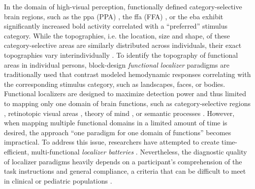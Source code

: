 In the domain of high-visual perception, functionally defined
category-selective brain regions, such as the \acl{ppa} (PPA)
\citep{epstein1998ppa}, the \acl{ffa} (FFA) \citep{kanwisher1997ffa}, or the
\ac{eba} \citep{downing2001bodyarea} exhibit significantly increased \acf{bold}
activity correlated with a ``preferred'' \citep[][p.
123]{debeck2008interpreting} stimulus category.
%
While the topographies, i.e. the location, size and shape, of these
category-selective areas are similarly distributed across individuals, their
exact topographies vary interindividually \citep{rosenke2021probabilistic,
zhen2017quantifying, zhen2015quantifying, frost2012measuring}.
To identify the topography of functional areas in individual persons,
block-design \textit{functional localizer} paradigms are traditionally used that
contrast modeled hemodynamic responses correlating with the corresponding
stimulus category, such as landscapes, faces, or bodies.
Functional localizers are designed to maximize detection power and thus limited
to mapping only one domain of brain functions, such as category-selective
regions \citep{stigliani2015temporal}, retinotopic visual areas
\citep{wang2015probabilistic}, theory of mind \citep{spunt2014validating}, or
semantic processes \citep{fedorenko2010new, fernandez2001language}.
However, when mapping multiple functional domains in a limited amount of time is
desired, the approach ``one paradigm for one domain of functions'' becomes
impractical.
To address this issue, researchers have attempted to create time-efficient,
multi-functional \textit{localizer batteries} \citep[e.g.,][]{barch2013function,
drobyshevsky2006rapid, pinel2007fast}.
Nevertheless, the diagnostic quality of localizer paradigms heavily depends on a
participant's comprehension of the task instructions and general compliance, a
criteria that can be difficult to meet in clinical or pediatric populations
\citep{eickhoff2020towards, vanderwal2019movies}.

